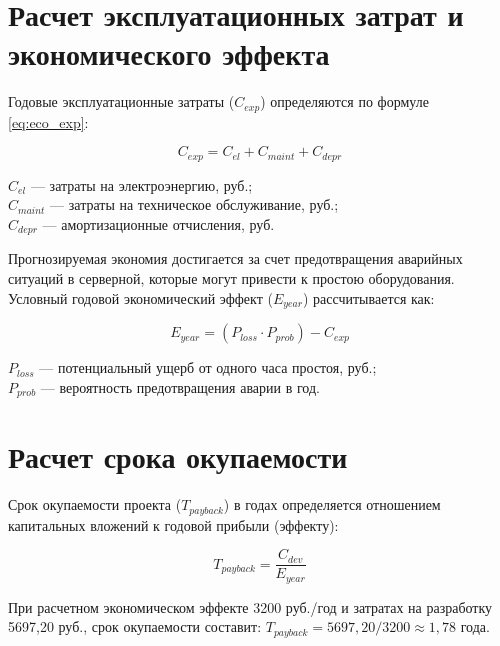 \section{Расчет эксплуатационных затрат и экономического эффекта}

Годовые эксплуатационные затраты ($C_{exp}$) определяются по формуле \eqref{eq:eco_exp}:

\begin{equation}
    C_{exp} = C_{el} + C_{maint} + C_{depr}
    \label{eq:eco_exp}
\end{equation}

\begin{formula_where}
    $C_{el}$ --- затраты на электроэнергию, руб.; \\
    $C_{maint}$ --- затраты на техническое обслуживание, руб.; \\
    $C_{depr}$ --- амортизационные отчисления, руб.
\end{formula_where}

Прогнозируемая экономия достигается за счет предотвращения аварийных ситуаций в серверной, которые могут привести к простою оборудования. Условный годовой экономический эффект ($E_{year}$) рассчитывается как:

\begin{equation}
    E_{year} = (P_{loss} \cdot P_{prob}) - C_{exp}
\end{equation}

\begin{formula_where}
    $P_{loss}$ --- потенциальный ущерб от одного часа простоя, руб.; \\
    $P_{prob}$ --- вероятность предотвращения аварии в год.
\end{formula_where}

\section{Расчет срока окупаемости}

Срок окупаемости проекта ($T_{payback}$) в годах определяется отношением капитальных вложений к годовой прибыли (эффекту):

\begin{equation}
    T_{payback} = \frac{C_{dev}}{E_{year}}
\end{equation}



При расчетном экономическом эффекте 3200 руб./год и затратах на разработку 5697,20 руб., срок окупаемости составит:
$T_{payback} = 5697,20 / 3200 \approx 1,78$ года.

\newpage
